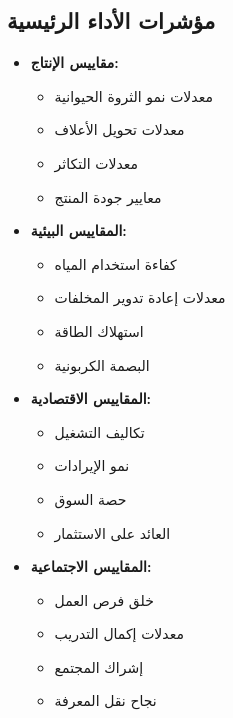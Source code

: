 \subsection{مؤشرات الأداء الرئيسية}
\begin{itemize}
    \item \textbf{مقاييس الإنتاج:}
    \begin{itemize}
        \item معدلات نمو الثروة الحيوانية
        \item معدلات تحويل الأعلاف
        \item معدلات التكاثر
        \item معايير جودة المنتج
    \end{itemize}
    
    \item \textbf{المقاييس البيئية:}
    \begin{itemize}
        \item كفاءة استخدام المياه
        \item معدلات إعادة تدوير المخلفات
        \item استهلاك الطاقة
        \item البصمة الكربونية
    \end{itemize}
    
    \item \textbf{المقاييس الاقتصادية:}
    \begin{itemize}
        \item تكاليف التشغيل
        \item نمو الإيرادات
        \item حصة السوق
        \item العائد على الاستثمار
    \end{itemize}
    
    \item \textbf{المقاييس الاجتماعية:}
    \begin{itemize}
        \item خلق فرص العمل
        \item معدلات إكمال التدريب
        \item إشراك المجتمع
        \item نجاح نقل المعرفة
    \end{itemize}
\end{itemize}


